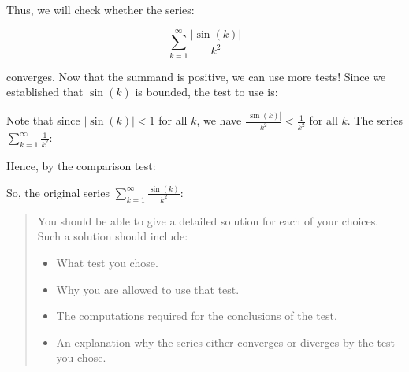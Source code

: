 \documentclass{ximera}
\begin{document}
\begin{exercise}
\begin{hint}
\begin{question}
Thus, we will check whether the series:

\[
\sum_{k=1}^{\infty} \frac{|\sin(k)|}{k^2}
\]

converges.  Now that the summand is positive, we can use more tests!  Since we established that $\sin(k)$ is bounded, the test to use is:
\begin{multipleChoice}
\end{multipleChoice}

Note that since $|\sin(k)|<1$ for all $k$, we have $\frac{|\sin(k)|}{k^2}<\frac{1}{k^2}$ for all $k$.  The series $\sum_{k=1}^{\infty} \frac{1}{k^2}$:

\begin{multipleChoice}
\end{multipleChoice}

Hence, by the comparison test:

\begin{multipleChoice}
\end{multipleChoice}

So, the original series $\sum_{k=1}^{\infty} \frac{\sin(k)}{k^2}$:
\begin{multipleChoice}
\end{multipleChoice}


\end{question}
\end{hint}







\begin{quote}
You should be able to give a detailed solution for each of your choices.  Such a solution should include:

\begin{itemize}
\item What test you chose.
\item Why you are allowed to use that test.
\item The computations required for the conclusions of the test.
\item An explanation why the series either converges or diverges by the test you chose.
\end{itemize}

\end{quote}


\end{exercise}
\end{document}
